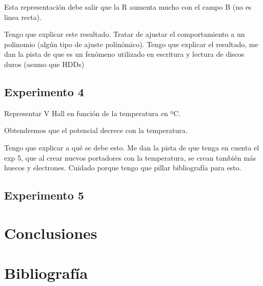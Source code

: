 Esta representación debe salir que la R aumenta mucho con el campo B (no es linea recta). 

Tengo que explicar este resultado. Tratar de ajustar el comportamiento a un polinomio (algún tipo de ajuste polinómico). Tengo que explicar el resultado, me dan la pista de que es un fenómeno utilizado en escritura y lectura de discos duros (asumo que HDDs)



\subsection{Experimento 4}

Representar V Hall en función de la temperatura en ºC.

Obtendremos que el potencial decrece con la temperatura. 

Tengo que explicar a qué se debe esto. Me dan la pista de que tenga en cuenta el exp 5, que al crear nuevos portadores con la temperatura, se crean también más huecos y electrones. Cuidado porque tengo que pillar bibliografía para esto.


\subsection{Experimento 5}




\section{Conclusiones}


\section{Bibliografía}






